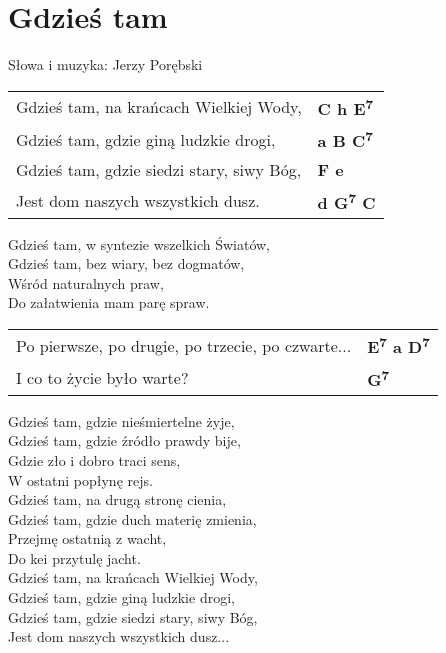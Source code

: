 \section{Gdzieś tam}

Słowa i muzyka: Jerzy Porębski

\vspace{2em}
\begin{tabular}{@{}p{8cm}@{}l@{}}
Gdzieś tam, na krańcach Wielkiej Wody, & \bfseries C h E\textsuperscript{7}\\
Gdzieś tam, gdzie giną ludzkie drogi, & \bfseries a B C\textsuperscript{7}\\
Gdzieś tam, gdzie siedzi stary, siwy Bóg, & \bfseries F e\\
Jest dom naszych wszystkich dusz. & \bfseries d G\textsuperscript{7} C\\
\end{tabular}

\vspace{1em}
Gdzieś tam, w syntezie wszelkich Światów, \\
Gdzieś tam, bez wiary, bez dogmatów, \\
Wśród naturalnych praw, \\
Do załatwienia mam parę spraw. \\

\vspace{2em}
\begin{tabular}{@{}p{8cm}@{}l@{}}
Po pierwsze, po drugie, po trzecie, po czwarte... & \bfseries E\textsuperscript{7} a D\textsuperscript{7}\\
I co to życie było warte? & \bfseries G\textsuperscript{7}\\
\end{tabular}

\vspace{1em}
Gdzieś tam, gdzie nieśmiertelne żyje, \\
Gdzieś tam, gdzie źródło prawdy bije, \\
Gdzie zło i dobro traci sens, \\
W ostatni popłynę rejs. \\

Gdzieś tam, na drugą stronę cienia, \\
Gdzieś tam, gdzie duch materię zmienia, \\
Przejmę ostatnią z wacht, \\
Do kei przytulę jacht. \\

Gdzieś tam, na krańcach Wielkiej Wody, \\
Gdzieś tam, gdzie giną ludzkie drogi, \\
Gdzieś tam, gdzie siedzi stary, siwy Bóg, \\
Jest dom naszych wszystkich dusz...